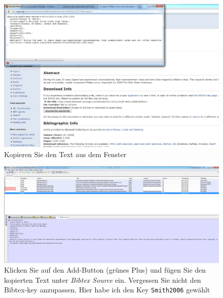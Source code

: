 \documentclass[a4paper,12pt]{scrartcl} %
\makeatletter
\def\ScaleIfNeeded{%
\ifdim\Gin@nat@width>\linewidth
\linewidth
\else
\Gin@nat@width
\fi
}
\makeatother
\begin{document}
\begin{figure}[t!]
\includegraphics[width=\ScaleIfNeeded]{Ideasbibtex}
\caption[Referenz von Bibtex entnehmen]{Kopieren Sie den Text aus dem Fenster}\label{fig:Ideas2}
\end{figure}
%
\begin{figure}[t!]
\includegraphics[width=\ScaleIfNeeded]{JabrefAdd}
\caption[Nutzung von JabRef]{Klicken Sie auf den Add-Button (grünes Plus) und fügen Sie den kopierten Text unter \emph{Bibtex Source} ein. Vergessen Sie nicht den Bibtex-key anzupassen. Hier habe ich den Key \texttt{Smith2006} gewählt}\label{fig:jabref}
\end{figure}
\end{document}
